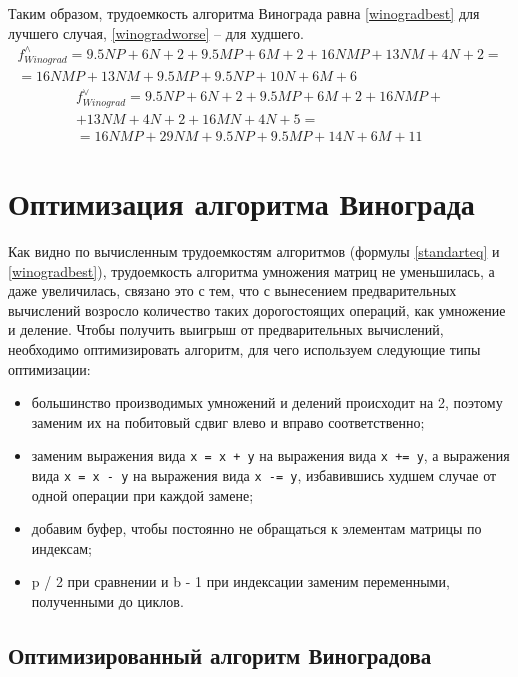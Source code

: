 Таким образом, трудоемкость алгоритма Винограда равна \ref{winogradbest} для
лучшего случая, \ref{winogradworse} -- для худшего.
\begin{multline}\label{winogradbest}
    f_{Winograd}^{\wedge} = 9.5NP + 6N + 2 +
                            9.5MP + 6M + 2 + 16NMP + 13NM + 4N + 2 = \\
                            = 16NMP + 13NM +9.5MP + 9.5NP + 10N + 6M + 6
\end{multline}
\begin{multline}\label{winogradworse}
    f_{Winograd}^{\vee} = 9.5NP + 6N + 2 + 9.5MP + 6M + 2 + 16NMP + \\
                            + 13NM + 4N + 2 + 16MN + 4N + 5 = \\
                        = 16NMP + 29NM +9.5NP + 9.5 MP + 14N + 6M + 11
\end{multline}


\section{Оптимизация алгоритма Винограда}

Как видно по вычисленным трудоемкостям алгоритмов (формулы \ref{standarteq} и
\ref{winogradbest}), трудоемкость алгоритма умножения матриц не уменьшилась, а
даже увеличилась, связано это с тем, что с вынесением предварительных
вычислений возросло количество таких дорогостоящих операций, как умножение и
деление. Чтобы получить выигрыш от предварительных вычислений, необходимо
оптимизировать алгоритм, для чего используем следующие типы оптимизации:
\begin{itemize}[left=\parindent]
    \item большинство производимых умножений и делений происходит на 2, поэтому
          заменим их на побитовый сдвиг влево и вправо соответственно;
    \item заменим выражения вида \texttt{x = x + y} на выражения вида \texttt{x
        += y}, а выражения вида \texttt{x = x - y} на выражения вида \texttt{x
        -= y}, избавившись худшем случае от одной операции при каждой замене;
    \item добавим буфер, чтобы постоянно не обращаться к элементам матрицы по индексам;
    \item p / 2 при сравнении и b - 1 при индексации заменим переменными, полученными до циклов.
\end{itemize}

\subsection{Оптимизированный алгоритм Виноградова}

